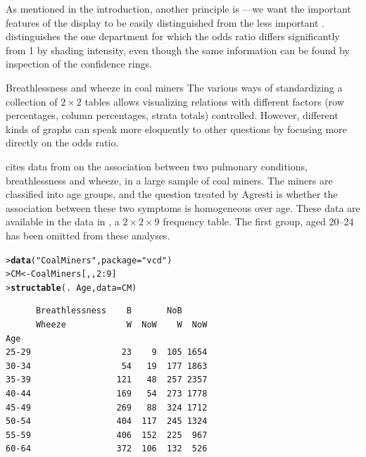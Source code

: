 \documentclass[10pt,krantz2]{krantz}\usepackage[]{graphicx}\usepackage[]{color}
\makeatletter
\newcommand{\hlnum}[1]{\textcolor[rgb]{0.686,0.059,0.569}{#1}}%
\newcommand{\hlstr}[1]{\textcolor[rgb]{0.192,0.494,0.8}{#1}}%
\newcommand{\hlopt}[1]{\textcolor[rgb]{0,0,0}{#1}}%
\newcommand{\hlstd}[1]{\textcolor[rgb]{0.345,0.345,0.345}{#1}}%
\newcommand{\hlkwb}[1]{\textcolor[rgb]{0.69,0.353,0.396}{#1}}%
\newcommand{\hlkwc}[1]{\textcolor[rgb]{0.333,0.667,0.333}{#1}}%
\newcommand{\hlkwd}[1]{\textcolor[rgb]{0.737,0.353,0.396}{\textbf{#1}}}%
\newenvironment{kframe}{%
 \def\at@end@of@kframe{}%
 \ifinner\ifhmode%
  \def\at@end@of@kframe{\end{minipage}}%
  \begin{minipage}{\columnwidth}%
 \fi\fi%
 \def\FrameCommand##1{\hskip\@totalleftmargin \hskip-\fboxsep
 \colorbox{shadecolor}{##1}\hskip-\fboxsep
     \hskip-\linewidth \hskip-\@totalleftmargin \hskip\columnwidth}%
 \MakeFramed {\advance\hsize-\width
   \@totalleftmargin\z@ \linewidth\hsize
   \@setminipage}}%
 {\par\unskip\endMakeFramed%
 \at@end@of@kframe}
\newenvironment{knitrout}{}{} %
\renewenvironment{knitrout}{\small\renewcommand{\baselinestretch}{.85}}{} %
\makeatother
\begin{document}
As mentioned in the introduction, another principle is ---we want the important
features
of the display to be easily distinguished from the less important
\citep{Tukey:93}.
 distinguishes the one department for which
the odds ratio differs significantly from 1 by shading intensity,
even though the same information can be found by inspection of the
confidence rings.

\begin{Example}[wheeze1]{Breathlessness and wheeze in coal miners}
The various ways of standardizing a collection of $2 \times 2$ tables
allows visualizing relations with different factors
(row percentages, column percentages, strata totals) controlled.
However, different kinds of graphs can speak more eloquently to other questions by focusing more directly on the odds ratio.

\citet[Table 9.8]{Agresti:2002} cites data from
\citet{AshfordSowden:70} on the association between
two pulmonary conditions, breathlessness and wheeze, in a large sample of coal miners.
The miners are classified into age groups, and the question treated
by Agresti is whether the association between these two symptoms
is homogeneous over age.
These data are available in the  data in
, a $2 \times 2 \times 9$ frequency table.
The first group, aged 20--24 has been omitted from these
analyses.
\begin{knitrout}
\color{fgcolor}\begin{kframe}
\begin{alltt}
\hlstd{> }\hlkwd{data}\hlstd{(}\hlstr{"CoalMiners"}\hlstd{,} \hlkwc{package} \hlstd{=} \hlstr{"vcd"}\hlstd{)}
\hlstd{> }\hlstd{CM} \hlkwb{<-} \hlstd{CoalMiners[, ,} \hlnum{2} \hlopt{:} \hlnum{9}\hlstd{]}
\hlstd{> }\hlkwd{structable}\hlstd{(.} \hlopt{~} \hlstd{Age,} \hlkwc{data} \hlstd{= CM)}
\end{alltt}
\begin{verbatim}
      Breathlessness    B       NoB     
      Wheeze            W  NoW    W  NoW
Age                                     
25-29                  23    9  105 1654
30-34                  54   19  177 1863
35-39                 121   48  257 2357
40-44                 169   54  273 1778
45-49                 269   88  324 1712
50-54                 404  117  245 1324
55-59                 406  152  225  967
60-64                 372  106  132  526
\end{verbatim}
\end{kframe}
\end{knitrout}


\end{Example}
\end{document}
